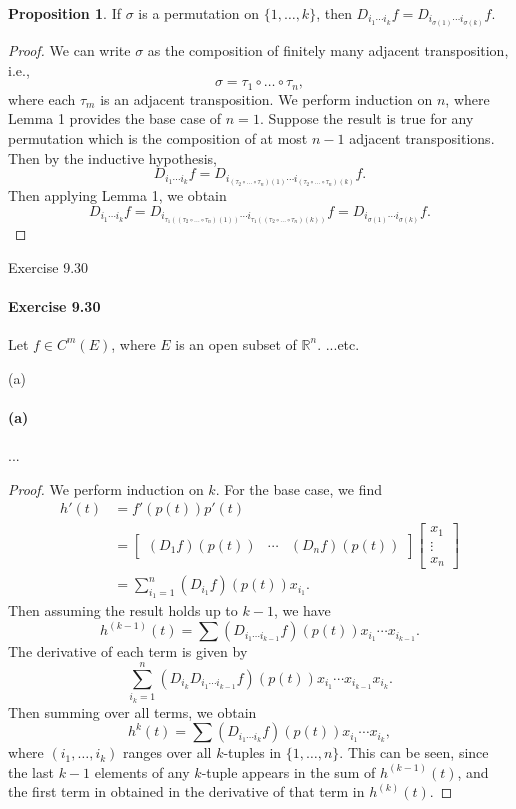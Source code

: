 \documentclass[12pt]{article}
\newenvironment{fullbox}{\begin{lrbox}{\savefullbox}\begin{minipage}{\dimexpr\textwidth-2\fboxsep\relax}}{\end{minipage}\end{lrbox}\begin{center}\framebox[\textwidth]{\usebox{\savefullbox}}\end{center}}
\newenvironment{pbox}[1][]{\begin{fullbox}\ifx#1\empty\else\paragraph{#1}\fi}{\end{fullbox}}
\theoremstyle{definition}
\newtheorem{proposition}{Proposition}
\newcommand{\R}{\mathbb{R}}
\newcommand{\mat}[1]{\begin{bmatrix}#1\end{bmatrix}}
\begin{document}
\begin{proposition}
    If $\sigma$ is a permutation on $\{1, \dots, k\}$, then $D_{i_1 \cdots i_k} f = D_{i_{\sigma(1)} \cdots i_{\sigma(k)}} f$.
\end{proposition}

\begin{proof}
    We can write $\sigma$ as the composition of finitely many adjacent transposition, i.e.,
    \[
        \sigma = \tau_1 \circ \dots \circ \tau_n,
    \]
    where each $\tau_m$ is an adjacent transposition. We perform induction on $n$, where Lemma 1 provides the base case of $n = 1$. Suppose the result is true for any permutation which is the composition of at most $n - 1$ adjacent transpositions. Then by the inductive hypothesis,
    \[
        D_{i_1 \cdots i_k}f = D_{i_{(\tau_2 \circ \dots \circ \tau_n)(1)} \cdots i_{(\tau_2 \circ \dots \circ \tau_n)(k)}} f.
    \]
    Then applying Lemma 1, we obtain
    \[
        D_{i_1 \cdots i_k}f
            = D_{i_{\tau_1((\tau_2 \circ \dots \circ \tau_n)(1))} \cdots i_{\tau_1((\tau_2 \circ \dots \circ \tau_n)(k))}} f
            = D_{i_{\sigma(1)} \cdots i_{\sigma(k)}} f.
    \]

\end{proof}


\newpage
\begin{pbox}[Exercise 9.30]
    Let $f \in C^m(E)$, where $E$ is an open subset of $\R^n$. ...etc.
\end{pbox}

\begin{pbox}[(a)]
    ...
\end{pbox}

\begin{proof}
    We perform induction on $k$. For the base case, we find
    \begin{align*}
        h'(t)
            &= f'(p(t))p'(t) \\
            &= \mat{(D_1f)(p(t)) & \cdots & (D_nf)(p(t))} \mat{x_1 \\ \vdots \\ x_n} \\
            &= \sum_{i_1 = 1}^{n} (D_{i_1}f)(p(t))x_{i_1}.
    \end{align*}
    Then assuming the result holds up to $k-1$, we have
    \[
        h^{(k-1)}(t) = \sum (D_{i_1 \cdots i_{k-1}}f)(p(t)) x_{i_1} \cdots x_{i_{k-1}}.
    \]
    The derivative of each term is given by
    \[
        \sum_{i_k = 1}^{n} (D_{i_k}D_{i_1 \cdots i_{k-1}}f)(p(t)) x_{i_1} \cdots x_{i_{k-1}} x_{i_k}.
    \]
    Then summing over all terms, we obtain
    \[
        h^{k}(t) = \sum (D_{i_1 \cdots i_k}f)(p(t)) x_{i_1} \cdots x_{i_k},
    \]
    where $(i_1, \dots, i_k)$ ranges over all $k$-tuples in $\{1, \dots, n\}$. This can be seen, since the last $k-1$ elements of any $k$-tuple appears in the sum of $h^{(k-1)}(t)$, and the first term in obtained in the derivative of that term in $h^{(k)}(t)$.

\end{proof}
\end{document}
